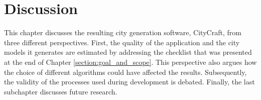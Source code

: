 \chapter{Discussion}

This chapter discusses the resulting city generation software, CityCraft, from three different perspectives.
First, the quality of the application and the city models it generates are estimated by addressing the checklist that was presented at the end of Chapter \ref{section:goal_and_scope}.
This perspective also argues how the choice of different algorithms could have affected the results.
Subsequently, the validity of the processes used during development is debated.
Finally, the last subchapter discusses future research.





